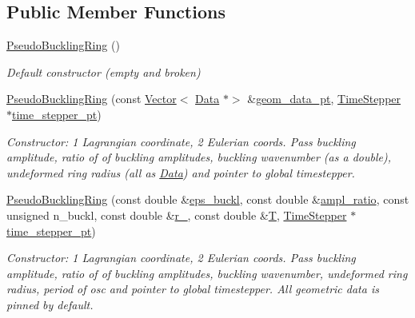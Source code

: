 \subsection*{Public Member Functions}
\begin{DoxyCompactItemize}
\item 
\hyperlink{classoomph_1_1PseudoBucklingRing_a7028441632808d2bc24d7f398aff3c6c}{Pseudo\+Buckling\+Ring} ()
\begin{DoxyCompactList}\small\item\em Default constructor (empty and broken) \end{DoxyCompactList}\item 
\hyperlink{classoomph_1_1PseudoBucklingRing_a0c6596032e6f3c5819220dfddbabcb0d}{Pseudo\+Buckling\+Ring} (const \hyperlink{classoomph_1_1Vector}{Vector}$<$ \hyperlink{classoomph_1_1Data}{Data} $\ast$$>$ \&\hyperlink{classoomph_1_1PseudoBucklingRing_a5f53b50c00bf2cf98db90a09dc65b410}{geom\+\_\+data\+\_\+pt}, \hyperlink{classoomph_1_1TimeStepper}{Time\+Stepper} $\ast$\hyperlink{classoomph_1_1GeomObject_a3c92023891dd4a0e818022f467eeb7f1}{time\+\_\+stepper\+\_\+pt})
\begin{DoxyCompactList}\small\item\em Constructor\+: 1 Lagrangian coordinate, 2 Eulerian coords. Pass buckling amplitude, ratio of of buckling amplitudes, buckling wavenumber (as a double), undeformed ring radius (all as \hyperlink{classoomph_1_1Data}{Data}) and pointer to global timestepper. \end{DoxyCompactList}\item 
\hyperlink{classoomph_1_1PseudoBucklingRing_a5569f859a21fc3ce498096397822fe47}{Pseudo\+Buckling\+Ring} (const double \&\hyperlink{classoomph_1_1PseudoBucklingRing_ad28891383abe71a473a079721c6dd53e}{eps\+\_\+buckl}, const double \&\hyperlink{classoomph_1_1PseudoBucklingRing_ade2881e77f7cf0be26970c78c70d3a4d}{ampl\+\_\+ratio}, const unsigned n\+\_\+buckl, const double \&\hyperlink{classoomph_1_1PseudoBucklingRing_ad202df097c0a68d93a5b2f99abf4c39b}{r\+\_}, const double \&\hyperlink{classoomph_1_1PseudoBucklingRing_af53f509aa119f74c77ae45046023f28f}{T}, \hyperlink{classoomph_1_1TimeStepper}{Time\+Stepper} $\ast$\hyperlink{classoomph_1_1GeomObject_a3c92023891dd4a0e818022f467eeb7f1}{time\+\_\+stepper\+\_\+pt})
\begin{DoxyCompactList}\small\item\em Constructor\+: 1 Lagrangian coordinate, 2 Eulerian coords. Pass buckling amplitude, ratio of of buckling amplitudes, buckling wavenumber, undeformed ring radius, period of osc and pointer to global timestepper. All geometric data is pinned by default. \end{DoxyCompactList}\item 
$$
\end{DoxyCompactItemize}
